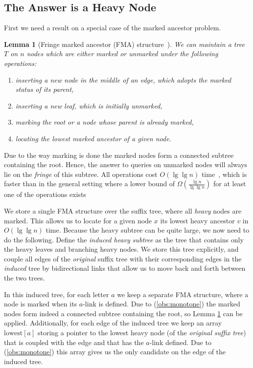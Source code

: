 \documentclass[11pt,onecolumn,final]{article} \usepackage{a4}
\theoremstyle{plain}
\newtheorem{lemma}[definition]{Lemma}
\theoremstyle{remark}
\begin{document}
\subsection{The Answer is a Heavy Node}
First we need a result on a special case of the marked ancestor problem.

\begin{lemma}[Fringe marked ancestor (FMA) structure~\cite{Breslauer11fringe}]
  \label{lem:fringe}
  We can maintain a tree $T$ on $n$ nodes which are either marked or unmarked under the following operations:
  \begin{enumerate}
  \item inserting a new node in the middle of an edge, which adopts the marked status of its parent,
  \item inserting a new leaf, which is initially unmarked,
  \item marking the root or a node whose parent is already marked,
  \item locating the lowest marked ancestor of a given node.
  \end{enumerate}
\end{lemma}

Due to the way marking is done the marked nodes form a connected subtree containing the root. Hence, the answer to queries on unmarked nodes will always lie on the \emph{fringe} of this subtree. All operations cost $O(\lg \lg n)$ time~\cite{Breslauer11fringe},
which is faster than in the general setting where a lower bound of $\Omega(\frac{\lg n}{\lg\lg n})$ for at least one of the operations exists~\cite{alstrup98marked}

We store a single FMA structure over the suffix tree, where all \emph{heavy} nodes are marked. This allows us to locate for a given node $x$ its lowest heavy ancestor $v$ in $O(\lg\lg n)$ time. Because the heavy subtree can be quite large, we now need to do the following. Define the \emph{induced heavy subtree} as the tree that contains only the heavy leaves and branching heavy nodes. We store this tree explicitly, and couple all edges of the \emph{original} suffix tree with their corresponding edges in the \emph{induced} tree by bidirectional links that allow us to move back and forth between the two trees.

In this induced tree, for each letter $a$ we keep a separate FMA structure, where a node is marked when its $a$-link is defined.
Due to (\ref{obs:monotone}) the marked nodes form indeed a connected subtree containing the root, so Lemma \ref{lem:fringe} can be applied.
Additionally, for each edge of the induced tree we keep an array $\mathrm{lowest}[a]$ storing a pointer to the lowest heavy node (of the \emph{original suffix tree}) that is coupled with the edge and that has the $a$-link defined. Due to (\ref{obs:monotone}) this array gives us the only candidate on the edge of the induced tree.
\end{document}
